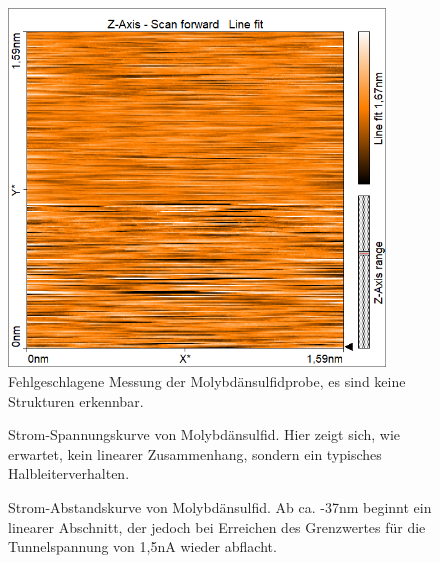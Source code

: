 \begin{figure}[H]
	\begin{center}
		\includegraphics[width=10cm]{Mess/mos_oberfl.png}
		\caption{Fehlgeschlagene Messung der Molybdänsulfidprobe, es sind keine Strukturen erkennbar.}
		\label{mos_oberfl}
	\end{center}
\end{figure} 



\begin{figure}[H]
	\centering
	\caption{Strom-Spannungskurve von Molybdänsulfid. Hier zeigt sich, wie erwartet, kein linearer Zusammenhang, sondern ein typisches Halbleiterverhalten.}
	\label{uimos}
\end{figure}




\begin{figure}[H]
	\centering
	\caption{Strom-Abstandskurve von Molybdänsulfid. Ab ca. -37nm beginnt ein linearer Abschnitt, der jedoch bei Erreichen des Grenzwertes für die Tunnelspannung von 1,5nA wieder abflacht.}
	\label{uamos}
\end{figure}

